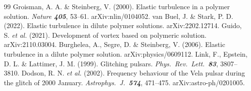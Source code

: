 \documentclass[11pt,a4paper]{article}
\begin{document}
\clearpage
\begin{thebibliography}{99}
     Groisman, A. A. \& Steinberg, V. (2000). Elastic
    turbulence in a polymer solution. \textit{Nature \textbf{405}}, 53--61.
    arXiv:nlin/0104052.
     van Buel, J. \& Stark, P. D. (2022). Elastic turbulence
    in dilute polymer solutions. arXiv:2202.12714.
     Guido, S. \textit{et al.} (2021). Development of
    vortex based on polymeric solution. arXiv:2110.03004.
     Burghelea, A., Segre, D. \& Steinberg, V. (2006).
    Elastic turbulence in a dilute polymer solution.
    arXiv:physics/0609112.
     Link, F., Epstein, D. L. \& Lattimer, J. M. (1999).
    Glitching pulsars. \textit{Phys.\ Rev.\ Lett.\ \textbf{83}}, 3807--3810.
     Dodson, R. N. \textit{et al.} (2002). Frequency
    behaviour of the Vela pulsar during the glitch of 2000 January.
    \textit{Astrophys.\ J.\ \textbf{574}}, 471--475.
    arXiv:astro-ph/0201005.
\end{thebibliography}
\end{document}
